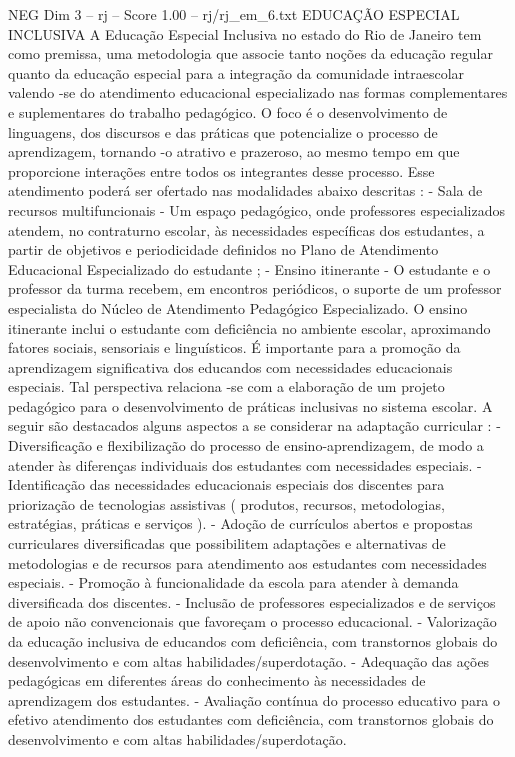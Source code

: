 \begin{textsample}{NEG Dim 3 – rj – Score 1.00 – rj/rj\_em\_6.txt}  \label{ex:f3_neg_275}
EDUCAÇÃO ESPECIAL INCLUSIVA A Educação Especial Inclusiva no estado do Rio de Janeiro tem como premissa, uma metodologia que associe tanto noções da educação regular quanto da educação especial para a integração da comunidade intraescolar valendo -se do atendimento educacional especializado nas formas complementares e suplementares do trabalho pedagógico.
O foco é o desenvolvimento de linguagens, dos discursos e das práticas que potencialize o processo de aprendizagem, tornando -o atrativo e prazeroso, ao mesmo tempo em que proporcione interações entre todos os integrantes desse processo.
Esse atendimento poderá ser ofertado nas modalidades abaixo descritas : - Sala de recursos multifuncionais - Um espaço pedagógico, onde professores especializados atendem, no contraturno escolar, às necessidades específicas dos estudantes, a partir de objetivos e periodicidade definidos no Plano de Atendimento Educacional Especializado do estudante ; - Ensino itinerante - O estudante e o professor da turma recebem, em encontros periódicos, o suporte de um professor especialista do Núcleo de Atendimento Pedagógico Especializado.
O ensino itinerante inclui o estudante com deficiência no ambiente escolar, aproximando fatores sociais, sensoriais e linguísticos.
É importante para a promoção da aprendizagem significativa dos educandos com necessidades educacionais especiais.
Tal perspectiva relaciona -se com a elaboração de um projeto pedagógico para o desenvolvimento de práticas inclusivas no sistema escolar.
A seguir são destacados alguns aspectos a se considerar na adaptação curricular : - Diversificação e flexibilização do processo de ensino-aprendizagem, de modo a atender às diferenças individuais dos estudantes com necessidades especiais. - Identificação das necessidades educacionais especiais dos discentes para priorização de tecnologias assistivas ( produtos, recursos, metodologias, estratégias, práticas e serviços ). - Adoção de currículos abertos e propostas curriculares diversificadas que possibilitem adaptações e alternativas de metodologias e de recursos para atendimento aos estudantes com necessidades especiais. - Promoção à funcionalidade da escola para atender à demanda diversificada dos discentes. - Inclusão de professores especializados e de serviços de apoio não convencionais que favoreçam o processo educacional. - Valorização da educação inclusiva de educandos com deficiência, com transtornos globais do desenvolvimento e com altas habilidades/superdotação. - Adequação das ações pedagógicas em diferentes áreas do conhecimento às necessidades de aprendizagem dos estudantes. - Avaliação contínua do processo educativo para o efetivo atendimento dos estudantes com deficiência, com transtornos globais do desenvolvimento e com altas habilidades/superdotação.

\end{textsample}
